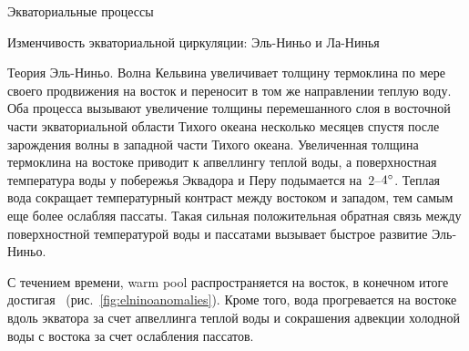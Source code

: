 \begin{chapter}{Экваториальные процессы}
\begin{section}{Изменчивость экваториальной циркуляции: Эль-Ниньо и Ла-Нинья}
\begin{paragraph}{Теория Эль-Ниньо.}
Волна Кельвина увеличивает толщину 
термоклина по мере своего продвижения на
восток и переносит в том же направлении теплую воду. Оба процесса вызывают
увеличение толщины перемешанного слоя%
 в восточной части
экваториальной области Тихого океана несколько месяцев спустя после зарождения
волны в западной части Тихого океана. Увеличенная толщина термоклина%
 на востоке приводит к 
апвеллингу теплой воды, а поверхностная
температура воды у побережья Эквадора и Перу подымается на~$2$--${4}^\circ$. 
Теплая вода сокращает температурный контраст между востоком и западом, тем
самым еще более ослабляя пассаты. Такая сильная положительная обратная связь
между поверхностной температурой воды и пассатами вызывает быстрое развитие
Эль-Ниньо.
%

С течением времени, warm pool распространяется на восток, в конечном итоге
достигая~ (рис.~\ref{fig:elninoanomalies}). Кроме того,
вода прогревается на востоке вдоль экватора за счет апвеллинга теплой воды
и сокрашения адвекции холодной воды с востока за счет ослабления пассатов.
%


\end{paragraph}
\end{section}
\end{chapter}
